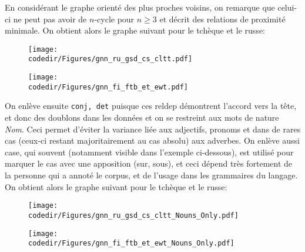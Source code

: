 \documentclass{cours}
\newcommand{\codedir}{Morphosyntactic-Categories_Code}
\begin{document}
    En considérant le graphe orienté des plus proches voisins, on remarque que celui-ci ne peut pas avoir de $n$-cycle pour $n \geq 3$ et décrit des relations de proximité minimale.
    On obtient alors le graphe suivant pour le tchèque et le russe:
    \begin{figure}[H]
	    \centering
	    \texttt{[image: \\codedir/Figures/gnn\_ru\_gsd\_cs\_cltt.pdf]}
    \end{figure}
    \begin{figure}[H]
	    \centering
	    \texttt{[image: \\codedir/Figures/gnn\_fi\_ftb\_et\_ewt.pdf]}
    \end{figure}
    On enlève ensuite \texttt{conj, det} puisque ces reldep démontrent l'accord vers la tête, et donc des doublons dans les données et on se restreint aux mots de nature \textit{Nom}. Ceci permet d'éviter la variance liée aux adjectifs, pronoms et dans de rares cas (ceux-ci restant majoritairement au cas absolu) aux adverbes.
    On enlève aussi case, qui souvent (notamment visible dans l'exemple ci-dessous), est utilisé pour marquer le cas avec une apposition (sur, sous), et ceci dépend très fortement de la personne qui a annoté le corpus, et de l'usage dans les grammaires du langage.\\
    On obtient alors le graphe suivant pour le tchèque et le russe:
    \begin{figure}[H]
	    \centering
	    \texttt{[image: \\codedir/Figures/gnn\_ru\_gsd\_cs\_cltt\_Nouns\_Only.pdf]}
    \end{figure}
    \begin{figure}[H]
	    \centering
	    \texttt{[image: \\codedir/Figures/gnn\_fi\_ftb\_et\_ewt\_Nouns\_Only.pdf]}
    \end{figure}
\end{document}
